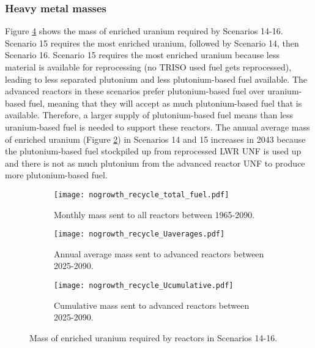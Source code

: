 \subsubsection{Heavy metal masses}
Figure \ref{fig:nogrowth_recycle_uranium} shows 
the mass of enriched uranium required by Scenarios 14-16. 
Scenario 15 requires the most enriched uranium, followed by 
Scenario 14, then Scenario 16. Scenario 15 requires the most enriched 
uranium because less material is available for reprocessing (no 
\gls{TRISO} used fuel gets reprocessed), leading to 
less separated plutonium and less plutonium-based fuel available. The 
advanced reactors 
in these scenarios prefer plutonium-based fuel over uranium-based fuel, 
meaning that they will accept as much plutonium-based fuel that 
is available. 
Therefore, a larger supply of plutonium-based fuel means than less 
uranium-based fuel is needed to support these reactors.
The annual average mass of enriched uranium (Figure 
\ref{fig:nogrowth_recycle_AR_uranium}) in Scenarios 14 and 15 increases 
in 2043 because the plutonium-based fuel stockpiled up from 
reprocessed \gls{LWR} \gls{UNF} is used up and there is not as much 
plutonium from the advanced reactor \gls{UNF} to produce more 
plutonium-based fuel. 

\begin{figure}[h!]
    \centering
    \begin{subfigure}[b]{0.45\textwidth}
        \centering
        \texttt{[image: nogrowth\_recycle\_total\_fuel.pdf]}
        \caption{Monthly mass sent to all reactors 
        between 1965-2090.}
        \label{fig:nogrowth_recycle_all_uranium}
    \end{subfigure}
    \hfill
    \begin{subfigure}[b]{0.45\textwidth}
        \centering
        \texttt{[image: nogrowth\_recycle\_Uaverages.pdf]}
        \caption{Annual average mass sent to 
        advanced reactors between 2025-2090.}
        \label{fig:nogrowth_recycle_AR_uranium}
    \end{subfigure}
    \begin{subfigure}[b]{0.45\textwidth}
        \centering
        \texttt{[image: nogrowth\_recycle\_Ucumulative.pdf]}
        \caption{Cumulative mass sent to advanced reactors between 2025-2090.}
        \label{fig:nogrowth_recycle_uranium_cumulative}
    \end{subfigure}
       \caption{Mass of enriched uranium required by reactors
        in Scenarios 14-16.}
       \label{fig:nogrowth_recycle_uranium}
\end{figure}

